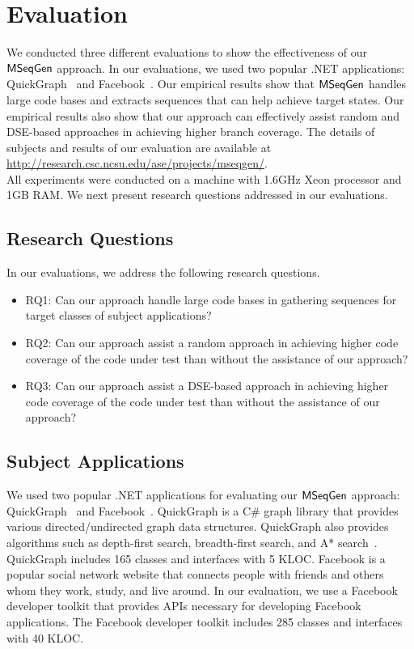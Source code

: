 \documentclass{sig-alternate}
\begin{document}
\section{Evaluation}
\label{sec:eval}

We conducted three different evaluations to show the effectiveness of our $\textsf{MSeqGen} $ approach. In our evaluations, we used two popular .NET applications: QuickGraph~\cite{QUICKGRAPH} and Facebook~\cite{FACEBOOK}. Our empirical results show that $\textsf{MSeqGen} $ handles large code bases and extracts sequences that can help achieve target states. Our empirical results also show that our approach can effectively assist random and DSE-based approaches in achieving higher branch coverage. The details of subjects and results of our evaluation are available at \url{http://research.csc.ncsu.edu/ase/projects/mseqgen/}. \\ All experiments were conducted on a machine with 1.6GHz Xeon processor and 1GB RAM. We next present research questions addressed in our evaluations.

\subsection{Research Questions}

In our evaluations, we address the following research questions.\vspace*{-1ex}

\begin{itemize}
\item RQ1: Can our approach handle large code bases in gathering sequences for target classes of subject applications?
\item RQ2: Can our approach assist a random approach in achieving higher code coverage of the code under test than without the assistance of our approach?
\item RQ3: Can our approach assist a DSE-based approach in achieving higher code coverage of the code under test than without the assistance of our approach?
\end{itemize}

\subsection{Subject Applications}

We used two popular .NET applications for evaluating our $\textsf{MSeqGen} $ approach: QuickGraph~\cite{QUICKGRAPH} and Facebook~\cite{FACEBOOK}. QuickGraph is a C\# graph library that provides various directed/undirected graph data structures. QuickGraph also provides algorithms such as depth-first search, breadth-first search, and A* search~\cite{thomas:algos}. 
QuickGraph includes 165 classes and interfaces with 5 KLOC. Facebook is a popular social network website that connects people with friends and others whom they work, study, and live around. In our evaluation, we use a Facebook developer toolkit that provides APIs necessary for developing Facebook applications. The Facebook developer toolkit includes 285 classes and interfaces with 40 KLOC.
\end{document}
